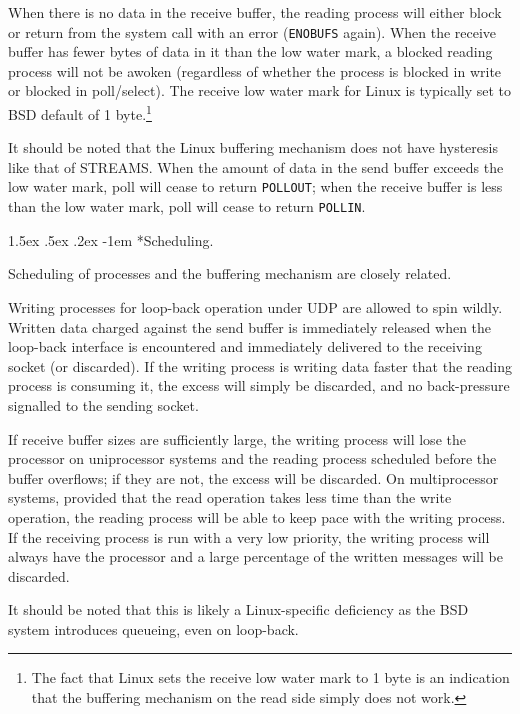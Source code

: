 \documentclass[letterpaper,final,notitlepage,twocolumn,10pt,twoside]{article}
\makeatletter
\renewcommand\paragraph{\@startsection{paragraph}{4}{\z@}%
                                    {1.5ex \@plus .5ex \@minus .2ex}%
                                    {-1em}%
                                    {\normalfont\normalsize\bfseries\slshape}}
\makeatother
\begin{document}
When there is no data in the receive buffer, the reading process will either block or return from
the system call with an error (\texttt{ENOBUFS} again).  When the receive buffer has fewer bytes of
data in it than the low water mark, a blocked reading process will not be awoken (regardless of
whether the process is blocked in write or blocked in poll/select).  The receive low water mark for
Linux is typically set to BSD default of 1 byte.\footnote{The fact that Linux sets the receive low
water mark to 1 byte is an indication that the buffering mechanism on the read side simply does not
work.}

It should be noted that the Linux buffering mechanism does not have hysteresis like that of STREAMS.
When the amount of data in the send buffer exceeds the low water mark, poll will cease to return
\texttt{POLLOUT}; when the receive buffer is less than the low water mark, poll will cease to return
\texttt{POLLIN}.

\paragraph*{Scheduling.}

Scheduling of processes and the buffering mechanism are closely related.

Writing processes for loop-back operation under UDP are allowed to spin wildly.  Written data
charged against the send buffer is immediately released when the loop-back interface is encountered
and immediately delivered to the receiving socket (or discarded).  If the writing process is writing
data faster that the reading process is consuming it, the excess will simply be discarded, and no
back-pressure signalled to the sending socket.

If receive buffer sizes are sufficiently large, the writing process will lose the processor on
uniprocessor systems and the reading process scheduled before the buffer overflows; if they are not,
the excess will be discarded.  On multiprocessor systems, provided that the read operation takes
less time than the write operation, the reading process will be able to keep pace with the writing
process.  If the receiving process is run with a very low priority, the writing process will always
have the processor and a large percentage of the written messages will be discarded.

It should be noted that this is likely a Linux-specific deficiency as the BSD system introduces
queueing, even on loop-back.
\end{document}
